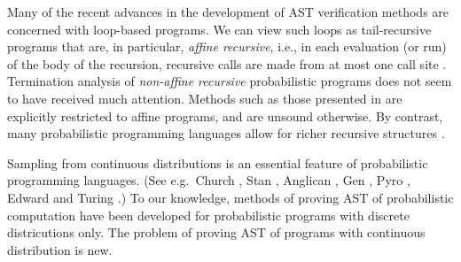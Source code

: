 Many of the recent advances in the development of AST verification methods \citep{DBLP:conf/pldi/ChenH20,DBLP:conf/cav/ChakarovS13,DBLP:conf/popl/FioritiH15,DBLP:journals/pacmpl/McIverMKK18,DBLP:conf/aplas/HuangFC18,DBLP:conf/popl/ChatterjeeNZ17,DBLP:journals/pacmpl/AgrawalC018,DBLP:conf/cav/ChatterjeeFG16,DBLP:conf/lics/OlmedoKKM16,DBLP:journals/pacmpl/Huang0CG19} are concerned with loop-based programs.
We can view such loops as tail-recursive programs that are, in particular, \emph{affine recursive}, i.e., 
in each evaluation (or run) of the body of the recursion, recursive calls are made from at most one call site \citep[\S 4.1]{DBLP:journals/toplas/LagoG19}.
Termination analysis of \emph{non-affine recursive} probabilistic programs does not seem to have received much attention.
Methods such as those presented in \citep{DBLP:journals/toplas/LagoG19} are explicitly restricted to affine programs, and are unsound otherwise.
By contrast, many probabilistic programming languages allow for richer recursive structures \cite{DBLP:conf/pkdd/TolpinMW15,DBLP:conf/uai/GoodmanMRBT08,DBLP:journals/corr/MansinghkaSP14}.

\medskip

Sampling from continuous distributions is an essential feature of probabilistic programming languages. (See e.g.~Church \citep{DBLP:conf/uai/GoodmanMRBT08}, Stan \citep{carpenter2017stan}, Anglican \citep{DBLP:conf/pkdd/TolpinMW15}, Gen \citep{cusumano-towner2019Gen}, Pyro \citep{bingham2019Pyro}, Edward \citep{tran2016edward} and Turing \citep{ge2018Turing}.)
To our knowledge, methods of proving AST of probabilistic computation have been developed for probabilistic programs with discrete districutions only.
The problem of proving AST of programs with continuous distribution is new.



